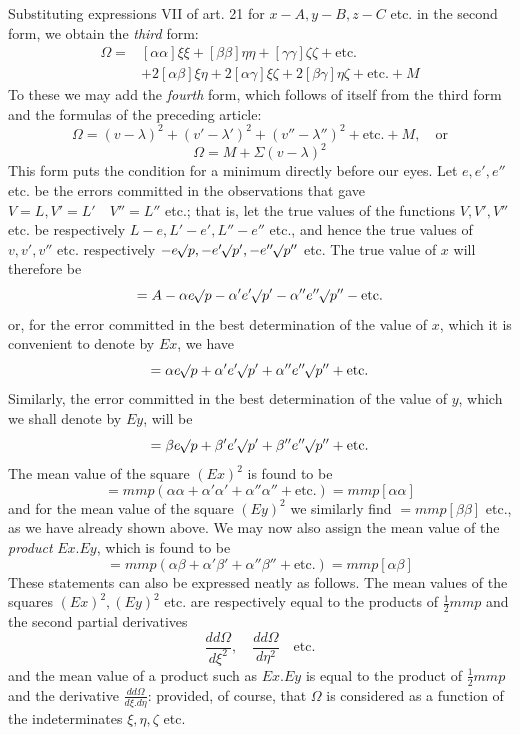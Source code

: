 Substituting expressions VII of art. 21 for \(x-A,y-B,z-C\) etc. in the second form, we obtain the \textit{third} form:
\[
\begin{aligned}
\Omega={}&[\alpha\alpha]\xi\xi+[\beta\beta]\eta\eta+[\gamma\gamma]\zeta\zeta+\text{etc.}\\
&+2[\alpha\beta]\xi\eta+2[\alpha\gamma]\xi\zeta+2[\beta\gamma]\eta\zeta+\text{etc.}+M
\end{aligned}
\]
To these we may add the \textit{fourth} form, which follows of itself from the third form and the formulas of the preceding article:
\[
\Omega=(v-\lambda)^2+(v'-\lambda')^2+(v''-\lambda'')^2+\text{etc.}+M,\quad\text{or}
\]
\[
\Omega=M+\Sigma(v-\lambda)^2
\]
This form puts the condition for a minimum directly before our eyes.
Let \(e,e',e''\) etc. be the errors committed in the observations that gave \(V=L,\allowbreak V'=L'\quad V''=L''\) etc.; that is, let the true values of the functions \(V,V',V''\) etc. be respectively \(L-e,L'-e',L''-e''\) etc., and hence the true values of \(v,v',v''\) etc. respectively \(-e\mathord{{}^{}\!\surd}p,\allowbreak-e'\mathord{{}^{}\!\surd}p',\allowbreak-e''\mathord{{}^{}\!\surd}p''\) etc. The true value of \(x\) will therefore be
\[
=A-\alpha e\mathord{{}^{}\!\surd}p-\alpha'e'\mathord{{}^{}\!\surd}p'-\alpha''e''\mathord{{}^{}\!\surd}p''-\text{etc.}
\]
or, for the error committed in the best determination of the value of \(x\), which it is convenient to denote by \(Ex\), we have
\[
=\alpha e\mathord{{}^{}\!\surd}p+\alpha'e'\mathord{{}^{}\!\surd}p'+\alpha''e''\mathord{{}^{}\!\surd}p''+\text{etc.}
\]
Similarly, the error committed in the best determination of the value of \(y\), which we shall denote by \(Ey\), will be
\[
=\beta e\mathord{{}^{}\!\surd}p+\beta'e'\mathord{{}^{}\!\surd}p'+\beta''e''\mathord{{}^{}\!\surd}p''+\text{etc.}
\]
The mean value of the square \((Ex)^2\) is found to be
\[
=mmp(\alpha\alpha+\alpha'\alpha'+\alpha''\alpha''+\text{etc.})=mmp[\alpha\alpha]
\]
and for the mean value of the square \((Ey)^2\) we similarly find \(=mmp[\beta\beta]\) etc., as we have already shown above. We may now also assign the mean value of the \textit{product} \(Ex.Ey\), which is found to be
\[
=mmp(\alpha\beta+\alpha'\beta'+\alpha''\beta''+\text{etc.})=mmp[\alpha\beta]
\]
These statements can also be expressed neatly as follows. The mean values of the squares \((Ex)^2,(Ey)^2\) etc. are respectively equal to the products of \(\frac12mmp\) and the second partial derivatives
\[
\frac{dd\Omega}{d\xi^2},\quad\frac{dd\Omega}{d\eta^2}\quad\text{etc.}
\]
and the mean value of a product such as \(Ex.Ey\) is equal to the product of \(\frac12mmp\) and the derivative \(\frac{dd\Omega}{d\xi.d\eta}\): provided, of course, that \(\Omega\) is considered as a function of the indeterminates \(\xi,\eta,\zeta\) etc.
\clearpage
